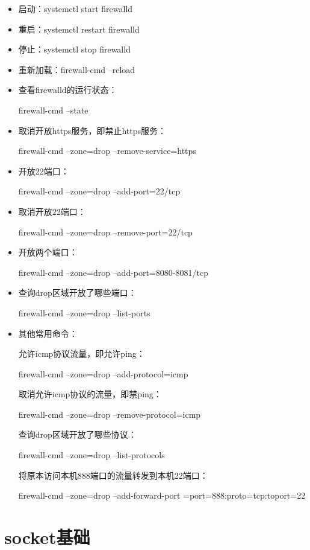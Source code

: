 \documentclass[UTF8]{article}%
\begin{document}
\begin{itemize}
    \item 启动：systemctl start firewalld
    \item 重启：systemctl restart firewalld
    \item 停止：systemctl stop firewalld
    \item 重新加载：firewall-cmd --reload
    \item 查看firewalld的运行状态：
    
        firewall-cmd --state

    \item 取消开放https服务，即禁止https服务：
    
        firewall-cmd --zone=drop --remove-service=https

    \item 开放22端口：
    
        firewall-cmd --zone=drop --add-port=22/tcp

    \item 取消开放22端口：
    
        firewall-cmd --zone=drop --remove-port=22/tcp

    \item 开放两个端口：
    
    firewall-cmd --zone=drop --add-port=8080-8081/tcp

    \item 查询drop区域开放了哪些端口：
    
    firewall-cmd --zone=drop --list-ports

    \item 其他常用命令：
    
    允许icmp协议流量，即允许ping：

    firewall-cmd --zone=drop --add-protocol=icmp

    取消允许icmp协议的流量，即禁ping：

    firewall-cmd --zone=drop --remove-protocol=icmp
    
    查询drop区域开放了哪些协议：

    firewall-cmd --zone=drop --list-protocols

    将原本访问本机888端口的流量转发到本机22端口：
    
    firewall-cmd --zone=drop --add-forward-port
    =port=888:proto=tcp:toport=22
\end{itemize}


\section{socket基础}
\end{document}
